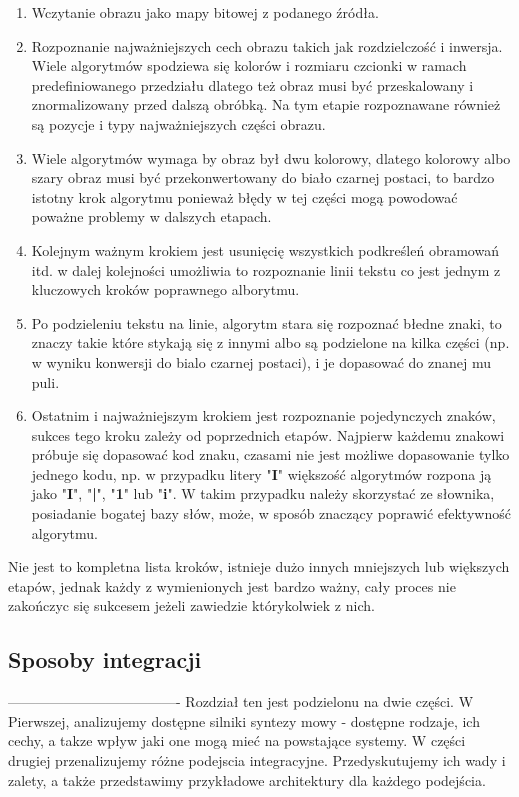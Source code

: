 \begin{enumerate}
	\item Wczytanie obrazu jako mapy bitowej z podanego źródła.
	\item Rozpoznanie najważniejszych cech obrazu takich jak rozdzielczość i inwersja. Wiele algorytmów spodziewa się kolorów i rozmiaru czcionki w ramach predefiniowanego przedziału dlatego też obraz musi być przeskalowany i znormalizowany przed dalszą obróbką. Na tym etapie rozpoznawane również są pozycje i typy najważniejszych części obrazu.
	\item Wiele algorytmów wymaga by obraz był dwu kolorowy, dlatego kolorowy albo szary obraz musi być przekonwertowany do biało czarnej postaci, to bardzo istotny krok algorytmu ponieważ błędy w tej części mogą powodować poważne problemy w dalszych etapach.
	\item Kolejnym ważnym krokiem jest usunięcię wszystkich podkreśleń obramowań itd. w dalej kolejności umożliwia to rozpoznanie linii tekstu co jest jednym z kluczowych kroków poprawnego alborytmu.
	\item Po podzieleniu tekstu na linie, algorytm stara się rozpoznać błedne znaki, to znaczy takie które stykają się z innymi albo są podzielone na kilka części (np. w wyniku konwersji do bialo czarnej postaci), i je dopasować do znanej mu puli.
	\item Ostatnim i najważniejszym krokiem jest rozpoznanie pojedynczych znaków, sukces tego kroku zależy od poprzednich etapów. Najpierw każdemu znakowi próbuje się dopasować kod znaku, czasami nie jest możliwe dopasowanie tylko jednego kodu, np. w przypadku litery "\textbf{I}" większość algorytmów rozpona ją jako "\textbf{I}", "\textbf{|}", "\textbf{1}" lub "\textbf{i}". W takim przypadku należy skorzystać ze słownika, posiadanie bogatej bazy słów, może, w sposób znaczący poprawić efektywność algorytmu.
\end{enumerate}
Nie jest to kompletna lista kroków, istnieje dużo innych mniejszych lub większych etapów, jednak każdy z wymienionych jest bardzo ważny, cały proces nie zakończyc się sukcesem jeżeli zawiedzie którykolwiek z nich. 




\subsection{Sposoby integracji}

-------------------------------------%
Rozdział ten jest podzielonu na dwie części. W Pierwszej, analizujemy dostępne silniki syntezy mowy - dostępne rodzaje, ich cechy, a takze wpływ jaki one mogą mieć na powstające systemy. W części drugiej przenalizujemy różne podejscia integracyjne. Przedyskutujemy ich wady i zalety, a także przedstawimy przykładowe architektury dla każdego podejścia. 

